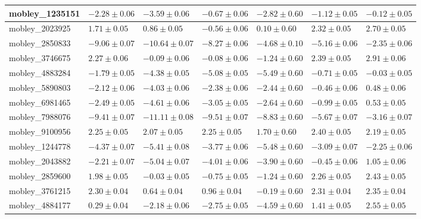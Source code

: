 \documentclass{article}
\begin{document}
\begin{landscape}
\begin{longtable}{|l{3.0cm}|l{3.0cm}|l{3.2cm}|l{3.6cm}|l{3.0cm}|l{3.0cm}|l{3.0cm}|}
mobley\_1235151	&	$	-2.28	\pm	0.06	$	&	$	-3.59	\pm	0.06	$	&	$	-0.67	\pm	0.06	$	&	$	-2.82	\pm	0.60	$	&	$	-1.12	\pm	0.05	$	&	$	-0.12	\pm	0.05	$	\\ \hline
mobley\_2023925	&	$	1.71	\pm	0.05	$	&	$	0.86	\pm	0.05	$	&	$	-0.56	\pm	0.06	$	&	$	0.10	\pm	0.60	$	&	$	2.32	\pm	0.05	$	&	$	2.70	\pm	0.05	$	\\ \hline
mobley\_2850833	&	$	-9.06	\pm	0.07	$	&	$	-10.64	\pm	0.07	$	&	$	-8.27	\pm	0.06	$	&	$	-4.68	\pm	0.10	$	&	$	-5.16	\pm	0.06	$	&	$	-2.35	\pm	0.06	$	\\ \hline
mobley\_3746675	&	$	2.27	\pm	0.06	$	&	$	-0.09	\pm	0.06	$	&	$	-0.08	\pm	0.06	$	&	$	-1.24	\pm	0.60	$	&	$	2.39	\pm	0.05	$	&	$	2.91	\pm	0.06	$	\\ \hline
mobley\_4883284	&	$	-1.79	\pm	0.05	$	&	$	-4.38	\pm	0.05	$	&	$	-5.08	\pm	0.05	$	&	$	-5.49	\pm	0.60	$	&	$	-0.71	\pm	0.05	$	&	$	-0.03	\pm	0.05	$	\\ \hline
mobley\_5890803	&	$	-2.12	\pm	0.06	$	&	$	-4.03	\pm	0.06	$	&	$	-2.38	\pm	0.06	$	&	$	-2.44	\pm	0.60	$	&	$	-0.46	\pm	0.06	$	&	$	0.48	\pm	0.06	$	\\ \hline
mobley\_6981465	&	$	-2.49	\pm	0.05	$	&	$	-4.61	\pm	0.06	$	&	$	-3.05	\pm	0.05	$	&	$	-2.64	\pm	0.60	$	&	$	-0.99	\pm	0.05	$	&	$	0.53	\pm	0.05	$	\\ \hline
mobley\_7988076	&	$	-9.41	\pm	0.07	$	&	$	-11.11	\pm	0.08	$	&	$	-9.51	\pm	0.07	$	&	$	-8.83	\pm	0.60	$	&	$	-5.67	\pm	0.07	$	&	$	-3.16	\pm	0.07	$	\\ \hline
mobley\_9100956	&	$	2.25	\pm	0.05	$	&	$	2.07	\pm	0.05	$	&	$	2.25	\pm	0.05	$	&	$	1.70	\pm	0.60	$	&	$	2.40	\pm	0.05	$	&	$	2.19	\pm	0.05	$	\\ \hline
mobley\_1244778	&	$	-4.37	\pm	0.07	$	&	$	-5.41	\pm	0.08	$	&	$	-3.77	\pm	0.06	$	&	$	-5.48	\pm	0.60	$	&	$	-3.09	\pm	0.07	$	&	$	-2.25	\pm	0.06	$	\\ \hline
mobley\_2043882	&	$	-2.21	\pm	0.07	$	&	$	-5.04	\pm	0.07	$	&	$	-4.01	\pm	0.06	$	&	$	-3.90	\pm	0.60	$	&	$	-0.45	\pm	0.06	$	&	$	1.05	\pm	0.06	$	\\ \hline
mobley\_2859600	&	$	1.98	\pm	0.05	$	&	$	-0.03	\pm	0.05	$	&	$	-0.75	\pm	0.05	$	&	$	-1.24	\pm	0.60	$	&	$	2.26	\pm	0.05	$	&	$	2.43	\pm	0.05	$	\\ \hline
mobley\_3761215	&	$	2.30	\pm	0.04	$	&	$	0.64	\pm	0.04	$	&	$	0.96	\pm	0.04	$	&	$	-0.19	\pm	0.60	$	&	$	2.31	\pm	0.04	$	&	$	2.35	\pm	0.04	$	\\ \hline
mobley\_4884177	&	$	0.29	\pm	0.04	$	&	$	-2.18	\pm	0.06	$	&	$	-2.75	\pm	0.05	$	&	$	-4.59	\pm	0.60	$	&	$	1.41	\pm	0.05	$	&	$	2.55	\pm	0.05	$	\\ \hline

\end{longtable}
\end{landscape}
\end{document}
